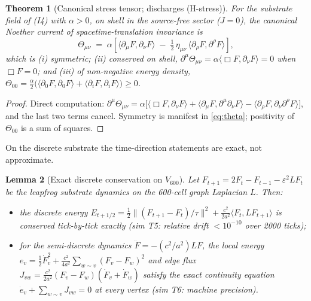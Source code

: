 \documentclass[12pt]{article}
\newtheorem{theorem}{Theorem}
\newtheorem{lemma}[theorem]{Lemma}
\theoremstyle{definition}
\theoremstyle{remark}
\newcommand{\Th}{\Theta}
\begin{document}
\begin{theorem}[Canonical stress tensor; discharges (H-stress)]\label{thm:noether}
For the substrate field of (I4) with $\alpha > 0$, on shell in the source-free sector ($J = 0$), the canonical Noether current of spacetime-translation invariance is
\begin{equation}
\Th_{\mu\nu} \;=\; \alpha\left[\langle\partial_\mu F, \partial_\nu F\rangle \;-\; \tfrac{1}{2}\,\eta_{\mu\nu}\,\langle\partial_\rho F, \partial^\rho F\rangle\right],
\label{eq:theta}
\end{equation}
which is (i) symmetric; (ii) conserved on shell, $\partial^\mu \Th_{\mu\nu} = \alpha\langle\Box F, \partial_\nu F\rangle = 0$ when $\Box F = 0$; and (iii) of non-negative energy density, $\Th_{00} = \tfrac{\alpha}{2}\big(\langle\partial_0 F,\partial_0 F\rangle + \langle\partial_i F,\partial_i F\rangle\big) \ge 0$.
\end{theorem}

\begin{proof}
Direct computation: $\partial^\mu\Th_{\mu\nu} = \alpha\big[\langle\Box F, \partial_\nu F\rangle + \langle\partial_\mu F, \partial^\mu\partial_\nu F\rangle - \langle\partial_\rho F, \partial_\nu\partial^\rho F\rangle\big]$, and the last two terms cancel. Symmetry is manifest in \eqref{eq:theta}; positivity of $\Th_{00}$ is a sum of squares.
\end{proof}

On the discrete substrate the time-direction statements are exact, not approximate.

\begin{lemma}[Exact discrete conservation on $V_{600}$]\label{lem:discrete}
Let $F_{t+1} = 2F_t - F_{t-1} - \varepsilon^2 L F_t$ be the leapfrog substrate dynamics on the 600-cell graph Laplacian $L$. Then:
\begin{itemize}
\item[(a)] the discrete energy $E_{t+1/2} = \tfrac{1}{2}\|(F_{t+1}-F_t)/\tau\|^2 + \tfrac{c^2}{2a^2}\langle F_t, L F_{t+1}\rangle$ is conserved tick-by-tick exactly (sim T5: relative drift $< 10^{-10}$ over 2000 ticks);
\item[(b)] for the semi-discrete dynamics $\ddot F = -(c^2/a^2) L F$, the local energy $e_v = \tfrac12 \dot F_v^2 + \tfrac{c^2}{4a^2}\sum_{w \sim v}(F_v - F_w)^2$ and edge flux $J_{vw} = \tfrac{c^2}{2a^2}(F_v - F_w)(\dot F_v + \dot F_w)$ satisfy the exact continuity equation $\dot e_v + \sum_{w\sim v} J_{vw} = 0$ at every vertex (sim T6: machine precision).
\end{itemize}
\end{lemma}
\end{document}

